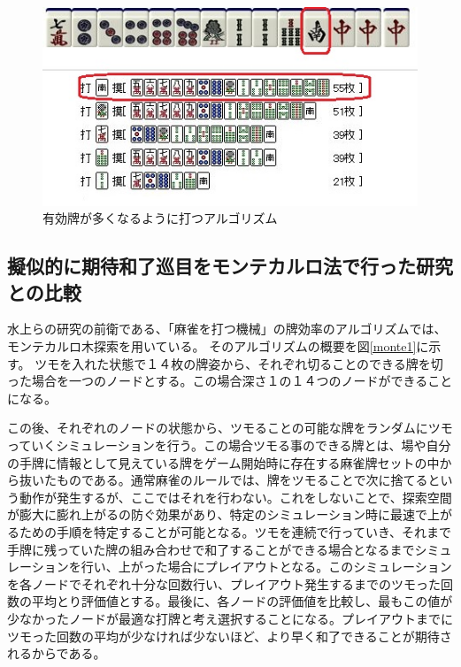 \begin{figure}[H]
 \centering
 \includegraphics[keepaspectratio, scale=1,bb=0 0 320 239]
      {img/yuko.jpg}
 \caption{有効牌が多くなるように打つアルゴリズム}
 \label{yuko}
\end{figure}


\subsection{擬似的に期待和了巡目をモンテカルロ法で行った研究との比較}

水上ら\cite{bakuuti2013}の研究の前衛である、「麻雀を打つ機械」\cite{nmizu}の牌効率のアルゴリズムでは、モンテカルロ木探索を用いている。
そのアルゴリズムの概要を図\ref{monte1}に示す。
ツモを入れた状態で１４枚の牌姿から、それぞれ切ることのできる牌を切った場合を一つのノードとする。この場合深さ１の１４つのノードができることになる。


この後、それぞれのノードの状態から、ツモることの可能な牌をランダムにツモっていくシミュレーションを行う。この場合ツモる事のできる牌とは、場や自分の手牌に情報として見えている牌をゲーム開始時に存在する麻雀牌セットの中から抜いたものである。通常麻雀のルールでは、牌をツモることで次に捨てるという動作が発生するが、ここではそれを行わない。これをしないことで、探索空間が膨大に膨れ上がるの防ぐ効果があり、特定のシミュレーション時に最速で上がるための手順を特定することが可能となる。ツモを連続で行っていき、それまで手牌に残っていた牌の組み合わせで和了することができる場合となるまでシミュレーションを行い、上がった場合にプレイアウトとなる。このシミュレーションを各ノードでそれぞれ十分な回数行い、プレイアウト発生するまでのツモった回数の平均とり評価値とする。最後に、各ノードの評価値を比較し、最もこの値が少なかったノードが最適な打牌と考え選択することになる。プレイアウトまでにツモった回数の平均が少なければ少ないほど、より早く和了できることが期待されるからである。

